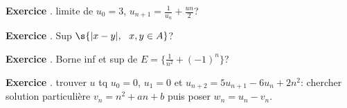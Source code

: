 \documentclass[10pt,a4paper]{article}
\newcounter{question}
\newcounter{exo}
\newenvironment{exo}{\vspace{0.5cm}\setcounter{question}{0}\addtocounter{exo}{1} \noindent \textbf{Exercice \theexo}. \normalsize }{\par}
\begin{document}
	\begin{exo}
		limite de $u_0 = 3$, $u_{n+1} = \frac{1}{u_n} + \frac{un}{2}$?
	\end{exo}
	
	\begin{exo}
		Sup $\s{\vert x - y \vert, ~~x, y \in A}$?
	\end{exo}

	\begin{exo}
		Borne inf et sup de $E = \lbrace \frac{1}{n^2} + {(-1)^n} \rbrace$?
	\end{exo}
	
	\begin{exo}
		trouver $u$ tq $u_0 =0$, $u_1 = 0$ et $u_{n+2} = 5u_{n+1} - 6u_n + 2n^2$: chercher solution particulière $v_n = n^2 + an + b$ puis poser $w_n = u_n - v_n$.
	\end{exo}		
\end{document}
